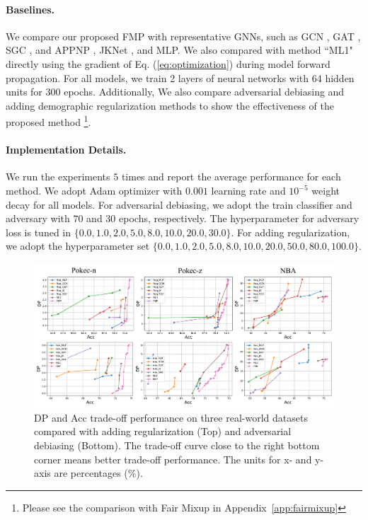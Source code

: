 \documentclass[letterpaper]{article} %
\theoremstyle{plain}
\theoremstyle{definition}
\theoremstyle{remark}
\begin{document}
\paragraph{Baselines.} We compare our proposed FMP with representative GNNs, such as GCN \citep{kipf2017semi}, GAT \citep{velivckovic2018graph}, SGC \citep{wu2019simplifying}, and APPNP \citep{klicpera2019predict}, JKNet \citep{xu2018representation}, and MLP. We also compared with method ``ML1" directly using the gradient of Eq. (\ref{eq:optimization}) during model forward propagation. For all models, we train 2 layers of neural networks with 64 hidden units for $300$ epochs. Additionally, We also compare adversarial debiasing and adding demographic regularization methods to show the effectiveness of the proposed method \footnote{Please see the comparison with Fair Mixup \citep{chuang2021fair} in Appendix~\ref{app:fairmixup}}.


\paragraph{Implementation Details.} We run the experiments $5$ times and report the average performance for each method. We adopt Adam optimizer with $0.001$ learning rate and $10^{-5}$ weight decay for all models.
For adversarial debiasing, we adopt the train classifier and adversary with $70$ and $30$ epochs, respectively.
The hyperparameter for adversary loss is tuned in $\{0.0, 1.0, 2.0, 5.0, 8.0, 10.0, 20.0, 30.0\}$. For adding regularization, we adopt the hyperparameter set $\{0.0, 1.0, 2.0, 5.0, 8.0, 10.0, 20.0, 50.0, 80.0, 100.0\}$.


\begin{figure}[t]
\centering
\includegraphics[width=0.95\linewidth]{Tradeoff_all.pdf}

\caption{DP and Acc trade-off performance on three real-world datasets compared with adding regularization (Top) and adversarial debiasing (Bottom). The trade-off curve close to the right bottom corner means better trade-off performance. The units for x- and y-axis are percentages ($\%$).}
\label{fig:pareto}
\end{figure}
\end{document}
